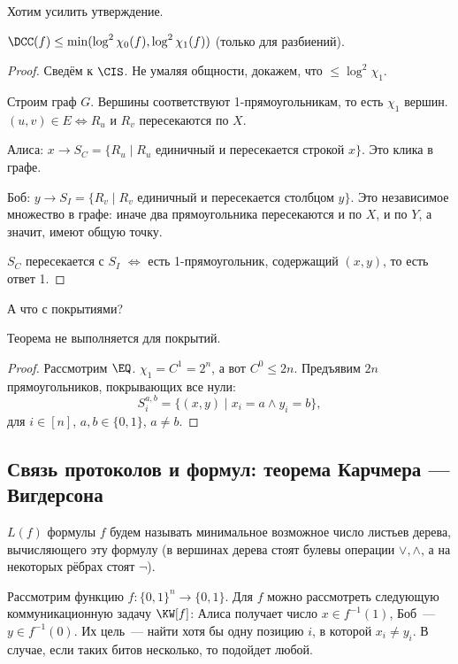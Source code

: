 
Хотим усилить утверждение.

\begin{theorem}
    $\DCC(f) \le \min(\log^2\chi_0(f), \log^2\chi_1(f))$ (только для разбиений).
\end{theorem}

\begin{proof}
    Сведём к $\CIS$. Не умаляя общности, докажем, что $\le \log^2 \chi_1$.

    Строим граф $G$. Вершины соответствуют 1-прямоугольникам, то есть $\chi_1$ вершин. $(u, v) \in E \iff
    R_u$ и $R_v$ пересекаются по $X$.

    Алиса: $x \to S_C = \{R_u \mid R_u \text{ единичный и пересекается строкой $x$}\}$. Это клика в
    графе.

    Боб: $y \to S_I = \{R_v \mid R_v \text{ единичный и пересекается столбцом $y$}\}$. Это независимое
    множество в графе: иначе два прямоугольника пересекаются и по $X$, и по $Y$, а значит, имеют общую
    точку.

    $S_C$ пересекается с $S_I$ $\iff$ есть 1-прямоугольник, содержащий $(x,y)$, то есть ответ 1.
\end{proof}

А что с покрытиями?
\begin{proposition}
    Теорема не выполняется для покрытий.
\end{proposition}

\begin{proof}
    Рассмотрим $\EQ$. $\chi_1 = C^1 = 2^n$, а вот $C^0 \le 2n$. Предъявим $2n$ прямоугольников,
    покрывающих все нули:
    $$
    S^{a,b}_i = \{(x, y) \mid x_i = a \land y_i = b\},
    $$
    для $i \in [n]$, $a, b \in \{0, 1\}$, $a \neq b$.
\end{proof}

\subsection{Связь протоколов и формул: теорема Карчмера --- Вигдерсона}

\begin{definition}
     $L(f)$ формулы $f$ будем называть минимальное возможное число листьев
    дерева, вычисляющего эту формулу (в вершинах дерева стоят булевы операции $\vee, \wedge$, а на
    некоторых рёбрах стоят $\neg $).
\end{definition}


Рассмотрим функцию $f\colon \{0, 1\}^n \to \{0, 1\}$. Для $f$ можно рассмотреть следующую
коммуникационную задачу $\KW[f]$: Алиса получает число $x \in f^{-1}(1)$, Боб~--- $y \in f^{-1}(0)$. Их
цель~--- найти хотя бы одну позицию $i$, в которой $x_i \ne y_i$. В случае, если таких битов несколько,
то подойдет любой.

